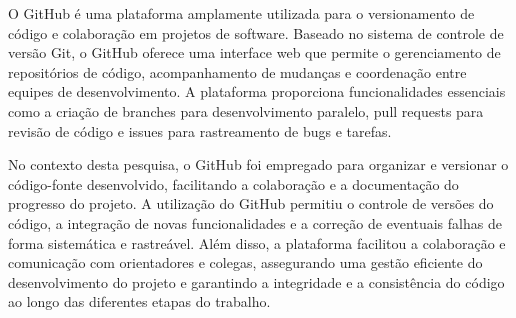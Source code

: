 O GitHub é uma plataforma amplamente utilizada para o versionamento de código e colaboração em projetos de software. Baseado no sistema de controle de versão Git, o GitHub oferece uma interface web que permite o gerenciamento de repositórios de código, acompanhamento de mudanças e coordenação entre equipes de desenvolvimento. A plataforma proporciona funcionalidades essenciais como a criação de branches para desenvolvimento paralelo, pull requests para revisão de código e issues para rastreamento de bugs e tarefas. 

No contexto desta pesquisa, o GitHub foi empregado para organizar e versionar o código-fonte desenvolvido, facilitando a colaboração e a documentação do progresso do projeto. A utilização do GitHub permitiu o controle de versões do código, a integração de novas funcionalidades e a correção de eventuais falhas de forma sistemática e rastreável. Além disso, a plataforma facilitou a colaboração e comunicação com orientadores e colegas, assegurando uma gestão eficiente do desenvolvimento do projeto e garantindo a integridade e a consistência do código ao longo das diferentes etapas do trabalho.